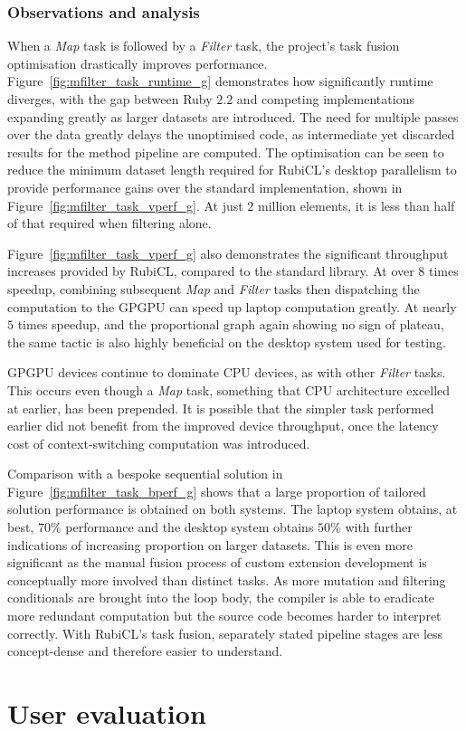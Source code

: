 \subsubsection{Observations and analysis}
When a \emph{Map} task is followed by a \emph{Filter} task, the project's task fusion optimisation drastically improves performance.
Figure~\ref{fig:mfilter_task_runtime_g} demonstrates how significantly runtime diverges, with the gap between Ruby $2.2$ and competing implementations expanding greatly as larger datasets are introduced.
The need for multiple passes over the data greatly delays the unoptimised code, as intermediate yet discarded results for the method pipeline are computed.
The optimisation can be seen to reduce the minimum dataset length required for RubiCL's desktop parallelism to provide performance gains over the standard implementation, shown in Figure~\ref{fig:mfilter_task_vperf_g}. At just $2$ million elements, it is less than half of that required when filtering alone.

Figure~\ref{fig:mfilter_task_vperf_g} also demonstrates the significant throughput increases provided by RubiCL, compared to the standard library. At over $8$ times speedup, combining subsequent \emph{Map} and \emph{Filter} tasks then dispatching the computation to the \ac{GPGPU} can speed up laptop computation greatly. At nearly $5$ times speedup, and the proportional graph again showing no sign of plateau, the same tactic is also highly beneficial on the desktop system used for testing.

\ac{GPGPU} devices continue to dominate \ac{CPU} devices, as with other \emph{Filter} tasks. This occurs even though a \emph{Map} task, something that \ac{CPU} architecture excelled at earlier, has been prepended. It is possible that the simpler task performed earlier did not benefit from the improved device throughput, once the latency cost of context-switching computation was introduced.

Comparison with a bespoke sequential solution in Figure~\ref{fig:mfilter_task_bperf_g} shows that a large proportion of tailored solution performance is obtained on both systems.
The laptop system obtains, at best, $70\%$ performance and the desktop system obtains $50\%$ with further indications of increasing proportion on larger datasets.
This is even more significant as the manual fusion process of custom extension development is conceptually more involved than distinct tasks.
As more mutation and filtering conditionals are brought into the loop body, the compiler is able to eradicate more redundant computation but the source code becomes harder to interpret correctly. With RubiCL's task fusion, separately stated pipeline stages are less concept-dense and therefore easier to understand.


\section{User evaluation}
